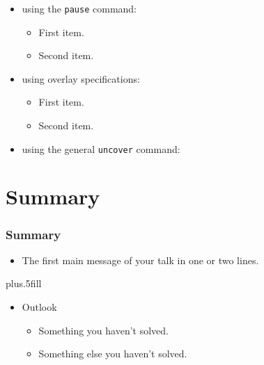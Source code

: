 \documentclass{beamer}
\begin{document}
\begin{frame}
\frametitle{}

\begin{itemize}
  \item using the \texttt{pause} command:
  \begin{itemize}
    \item First item.
    \pause
    \item Second item.
  \end{itemize}
  \item using overlay specifications:
  \begin{itemize}
    \item<3-> First item.
    \item<4-> Second item.
  \end{itemize}
  \item using the general \texttt{uncover} command:
  \begin{itemize}
  \end{itemize}
\end{itemize}
\end{frame}

\section*{Summary}

\begin{frame}
\frametitle<presentation>{Summary}

\begin{itemize}
  \item The \alert{first main message} of your talk in one or two lines.
\end{itemize}

\vskip0pt plus.5fill
\begin{itemize}
  \item Outlook
  \begin{itemize}
    \item Something you haven't solved.
    \item Something else you haven't solved.
  \end{itemize}
\end{itemize}
\end{frame}
\end{document}
